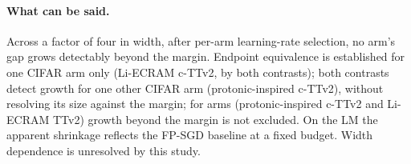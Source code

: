\paragraph{What can be said.} Across a factor of four in width, after per-arm learning-rate selection, no arm's gap grows
detectably beyond the margin. Endpoint equivalence is established for one CIFAR arm only (Li-ECRAM c-TTv2, by both contrasts);
both contrasts detect growth for one other CIFAR arm (protonic-inspired c-TTv2), without resolving its size against
the margin; for \RYWidthNotExcludedN{} arms (protonic-inspired c-TTv2 and
Li-ECRAM TTv2) growth beyond the margin is not excluded. On the LM the apparent shrinkage reflects the FP-SGD
baseline at a fixed budget. Width dependence is unresolved by this study.


